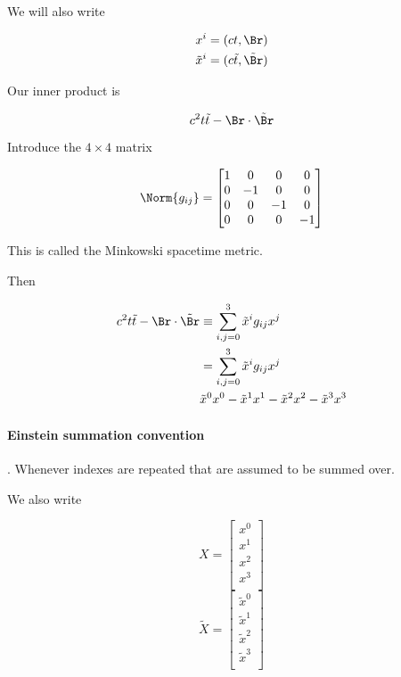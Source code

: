We will also write

\begin{align*}
x^i &= (ct, \Br) \\
\tilde{x}^i &= (c\tilde{t}, \tilde{\Br})
\end{align*}

Our inner product is

\begin{equation}\label{eqn:relativisticElectrodynamicsL6:20}
c^2 t \tilde{t} - \Br \cdot \tilde{\Br}
\end{equation}

Introduce the $4 \times 4$ matrix 

\begin{equation}\label{eqn:relativisticElectrodynamicsL6:30}
\Norm{g_{ij}} = 
\begin{bmatrix}
1 & 0 & 0 & 0 \\
0 & -1 & 0 & 0 \\
0 & 0 & -1 & 0 \\
0 & 0 & 0 & -1 \\
\end{bmatrix}
\end{equation}

This is called the Minkowski spacetime metric.

Then 

\begin{align*}
c^2 t \tilde{t} - \Br \cdot \tilde{\Br}
&\equiv \sum_{i, j = 0}^3 \tilde{x}^i g_{ij} x^j \\
&= \sum_{i, j = 0}^3 \tilde{x}^i g_{ij} x^j \\
& 
\tilde{x}^0 x^0 
-\tilde{x}^1 x^1 
-\tilde{x}^2 x^2 
-\tilde{x}^3 x^3 
\end{align*}

\paragraph{Einstein summation convention}.  Whenever indexes are repeated that are assumed to be summed over.

We also write

\begin{equation}\label{eqn:relativisticElectrodynamicsL6:40}
X = 
\begin{bmatrix}
x^0 \\
x^1 \\
x^2 \\
x^3 \\
\end{bmatrix}
\end{equation}
\begin{equation}\label{eqn:relativisticElectrodynamicsL6:50}
\tilde{X} = 
\begin{bmatrix}
\tilde{x}^0 \\
\tilde{x}^1 \\
\tilde{x}^2 \\
\tilde{x}^3 \\
\end{bmatrix}
\end{equation}


